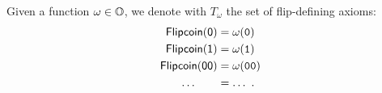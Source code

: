 {\begin{defn}
  \label{def:flipaxs}
  Given a function $\omega \in \mathbb{O}$, we denote with
  $T_\omega$ the set of flip-defining axioms:
  \begin{align*}
    \mathsf{Flipcoin}(\mathsf{0}) &= \omega(\mathtt{0})\\
    \mathsf{Flipcoin}(\mathsf{1}) &= \omega(\mathtt{1})\\
    \mathsf{Flipcoin}(\mathsf{0}\mathsf{0}) &= \omega(\mathtt{0}\mathtt{0})\\
    \ldots\quad\quad &= \ldots\ .
  \end{align*}
\end{defn}


%
%
%
%
%
%
%
%
}
